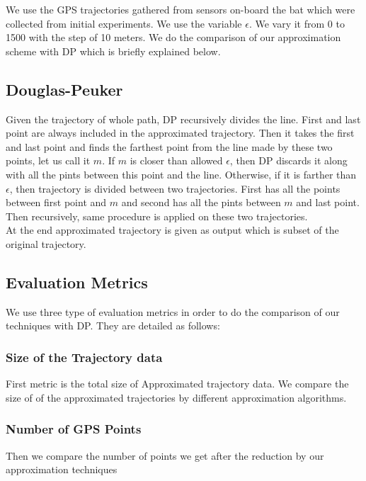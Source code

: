 \documentclass[conference]{IEEEtran}
\begin{document}
 We use the GPS trajectories gathered from sensors on-board the bat which were collected from initial experiments. We use 
 the variable $\epsilon$. We vary it from 0 to 1500 with the step of 10 meters.
 We do the comparison of our approximation scheme with DP which is briefly explained below.
 
 \subsection{Douglas-Peuker}\label{s:dp}
 Given the trajectory of whole path, DP recursively divides the line. First and last point are always included in the approximated 
 trajectory. Then it takes the first and last point and finds the farthest point from the line made by these two points, let us call it $m$. 
 If $m$ is closer than allowed $\epsilon$, then DP discards it along with all the pints between this point and the line. Otherwise, 
 if it is farther than $\epsilon$, then trajectory is divided between two trajectories. First has all the points between first point and 
 $m$ and second has all the pints between $m$ and last point. Then recursively, same procedure is applied on these two trajectories.\\
 At the end approximated trajectory is given as output which is subset of the original trajectory.
 
 \subsection{Evaluation Metrics}\label{s:evaluation-metrics}
 We use three type of evaluation metrics in order to do the comparison of our techniques with DP. They are detailed as follows:
 
 \subsubsection{Size of the Trajectory data}
 First metric is the total size of Approximated trajectory data. We compare the size of of the approximated trajectories by different 
 approximation algorithms.
 
 \subsubsection{Number of GPS Points}
 Then we compare the number of points we get after the reduction by our approximation techniques
\end{document}

